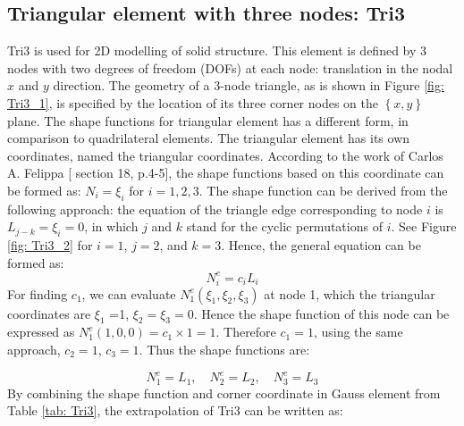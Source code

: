 \subsection{Triangular element with three nodes: Tri3}
Tri3 is used for 2D modelling of solid structure. This element is defined by 3 nodes with two degrees of freedom (DOFs) at each node: translation in the nodal $x$ and $y$ direction. The geometry of a 3-node triangle, as is shown in Figure \ref{fig: Tri3_1}, is specified by the location of its three corner nodes on the $\left\{x, y\right\}$ plane. The shape functions for triangular element has a different form, in comparison to quadrilateral elements. The triangular element has its own coordinates, named the triangular coordinates. According to the work of Carlos A. Felippa [\cite{Felippa} section 18, p.4-5], the shape functions based on this coordinate can be formed as: $N_i = \xi_i$ for $i = 1, 2, 3.$ The shape function can be derived from the following approach: the equation of the triangle edge corresponding to node $i$ is $L_{j-k} = \xi_i = 0$, in which $j$ and $k$ stand for the cyclic permutations of $i$. See Figure \ref{fig: Tri3_2} for $i = 1$, $j=2$, and $k = 3$. Hence, the general equation can be formed as:
\begin{equation}
N_i^e = c_iL_i
\end{equation}
For finding $c_1$, we can evaluate $N_1^e\left(\xi_1, \xi_2, \xi_3\right)$ at node 1, which the triangular coordinates are $\xi_1$ =1, $\xi_2 = \xi_3 = 0$.  Hence the shape function of this node can be expressed as $N_1^e\left(1,0,0\right) = c_1 \times 1 = 1$. Therefore $c_1 = 1$, using the same approach, $c_2 = 1$, $c_3 = 1$. Thus the shape functions are:

\begin{equation}
N_1^e = L_1 , \quad N_2^e = L_2, \quad N_3^e = L_3
\end{equation}
By combining the shape function and corner coordinate in Gauss element from Table \ref{tab: Tri3}, the extrapolation of Tri3 can be written as:

